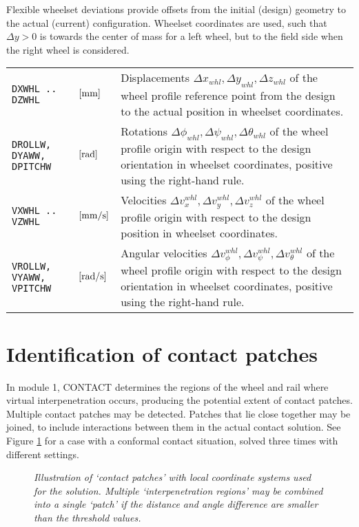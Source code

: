 \documentclass[12pt]{report}
\newenvironment{inputvars}{\vspace{0.4\baselineskip}%

\begin{tabular}{>{\raggedright}p{22mm}p{19mm}p{113mm}}}{
\end{tabular}

}
\newcommand{\inpvar}[3]{{\small\tt #1} & $#2$ & #3 \\[1ex]}
\begin{document}
Flexible wheelset deviations provide offsets from the initial (design)
geometry to the actual (current) configuration. Wheelset coordinates are
used, such that $\Delta y>0$ is towards the center of mass for a left
wheel, but to the field side when the right wheel is considered.
\begin{inputvars}
\inpvar{DXWHL .. \mbox{\hspace{4mm}DZWHL}}{\bunit{mm}}{Displacements 
        $\Delta x_{whl}, \Delta y_{whl}, \Delta z_{whl}$ of the wheel
        profile reference point from the design to the actual position
        in wheelset coordinates.}
\inpvar{DROLLW, \mbox{\hspace{4mm}DYAWW}, \mbox{\hspace{4mm}DPITCHW}}{
        \bunit{rad}}{Rotations $\Delta\phi_{whl}, \Delta\psi_{whl}, 
        \Delta\theta_{whl}$ of the wheel profile origin with respect to
        the design orientation in wheelset coordinates, positive using
        the right-hand rule.}
\inpvar{VXWHL .. \mbox{\hspace{4mm}VZWHL}}{\bunit{mm/s}}{Velocities 
        $\Delta v_x^{whl}, \Delta v_y^{whl}, \Delta v_z^{whl}$ of the
        wheel profile origin with respect to the design position in
        wheelset coordinates.}
\inpvar{VROLLW, \mbox{\hspace{4mm}VYAWW}, \mbox{\hspace{4mm}VPITCHW}}{
        \bunit{rad/s}}{Angular velocities $\Delta v_\phi^{whl}, 
        \Delta v_\psi^{whl}, \Delta v_\theta^{whl}$ of the wheel profile
        origin with respect to the design orientation in wheelset
        coordinates, positive using the right-hand rule.}
\end{inputvars}
 
\section{Identification of contact patches}
\label{sec:cpatches}

In module 1, CONTACT determines the regions of the wheel and rail where
virtual interpenetration occurs, producing the potential extent of 
contact patches. Multiple contact patches may be detected. Patches that lie
close together may be joined, to include interactions between them in the
actual contact solution. See Figure \ref{fig:site_b_cpatch} for a case with
a conformal contact situation, solved three times with different settings.

\begin{figure}[bt]
\centering
{}
\caption{\em Illustration of `contact patches' with local coordinate
        systems used for the solution. Multiple `interpenetration regions'
        may be combined into a single `patch' if the distance and angle
        difference are smaller than the threshold values.}
\label{fig:site_b_cpatch}
\end{figure}
\end{document}

